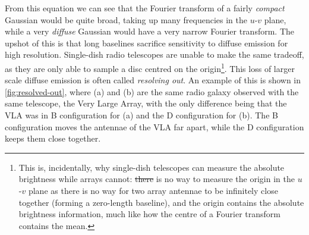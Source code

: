 \documentclass[11pt, a4paper]{book}
\newcommand{\defn}[1]{\emph{#1}}
\providecommand{\DIFaddtex}[1]{{\protect\color{blue}\uwave{#1}}} %
\providecommand{\DIFdeltex}[1]{{\protect\color{red}\sout{#1}}}                      %
\providecommand{\DIFaddbegin}{} %
\providecommand{\DIFaddend}{} %
\providecommand{\DIFdelbegin}{} %
\providecommand{\DIFdelend}{} %
\providecommand{\DIFadd}[1]{\texorpdfstring{\DIFaddtex{#1}}{#1}} %
\providecommand{\DIFdel}[1]{\texorpdfstring{\DIFdeltex{#1}}{}} %
\newcommand{\DIFscaledelfig}{0.5}
\newlength{\DIFdelgraphicswidth} %
\newlength{\DIFdelgraphicsheight} %
\newcommand{\DIFaddincludegraphics}[2][]{{\color{blue}\fbox{\DIFOincludegraphics[#1]{#2}}}} %
\newcommand{\DIFdelincludegraphics}[2][]{%
\sbox{\DIFdelgraphicsbox}{\DIFOincludegraphics[#1]{#2}}%
\settoboxwidth{\DIFdelgraphicswidth}{\DIFdelgraphicsbox} %
\settoboxtotalheight{\DIFdelgraphicsheight}{\DIFdelgraphicsbox} %
\scalebox{\DIFscaledelfig}{%
\parbox[b]{\DIFdelgraphicswidth}{\usebox{\DIFdelgraphicsbox}\\[-\baselineskip] \rule{\DIFdelgraphicswidth}{0em}}\llap{\resizebox{\DIFdelgraphicswidth}{\DIFdelgraphicsheight}{%
\setlength{\unitlength}{\DIFdelgraphicswidth}%
\begin{picture}(1,1)%
\thicklines\linethickness{2pt} %
{\color[rgb]{1,0,0}\put(0,0){\framebox(1,1){}}}%
{\color[rgb]{1,0,0}\put(0,0){\line( 1,1){1}}}%
{\color[rgb]{1,0,0}\put(0,1){\line(1,-1){1}}}%
\end{picture}%
}\hspace*{3pt}}} %
} %
\DeclareRobustCommand{\DIFaddbegin}{\DIFOaddbegin \let\includegraphics\DIFaddincludegraphics} %
\DeclareRobustCommand{\DIFaddend}{\DIFOaddend \let\includegraphics\DIFOincludegraphics} %
\DeclareRobustCommand{\DIFdelbegin}{\DIFOdelbegin \let\includegraphics\DIFdelincludegraphics} %
\DeclareRobustCommand{\DIFdelend}{\DIFOaddend \let\includegraphics\DIFOincludegraphics} %
\begin{document}
        From this equation we can see that the Fourier transform of a fairly \emph{compact} Gaussian \DIFaddbegin \DIFadd{(small $\sigma$) }\DIFaddend would be quite broad, taking up many frequencies in the $u$-$v$ plane, while a very \emph{diffuse} Gaussian \DIFaddbegin \DIFadd{(large $\sigma$) }\DIFaddend would have a very narrow Fourier transform. The upshot of this is that long baselines sacrifice sensitivity to diffuse emission for high resolution. Single-dish radio telescopes are unable to make the same tradeoff, as they are only able to sample a disc centred on the origin\footnote{This is, incidentally, why single-dish telescopes can measure the absolute brightness while arrays cannot: \DIFdelbegin \DIFdel{there }\DIFdelend \DIFaddbegin \DIFadd{There }\DIFaddend is no way to measure the origin in the $u$-$v$ plane as there is no way for two array antennae to be infinitely close together (forming a zero-length baseline), and the origin contains the absolute brightness information, much like how the centre of a Fourier transform contains the mean.}. This loss of larger scale diffuse emission is often called \defn{resolving out}. An example of this is shown in \autoref{fig:resolved-out}, where (a) and (b) are the same radio galaxy observed with the same telescope, the Very Large Array, with the only difference being that the VLA was in \DIFaddbegin \DIFadd{the }\DIFaddend B configuration for (a) and the D configuration for (b). The B configuration moves the antennae of the VLA far apart, while the D configuration keeps them close together.
\end{document}
